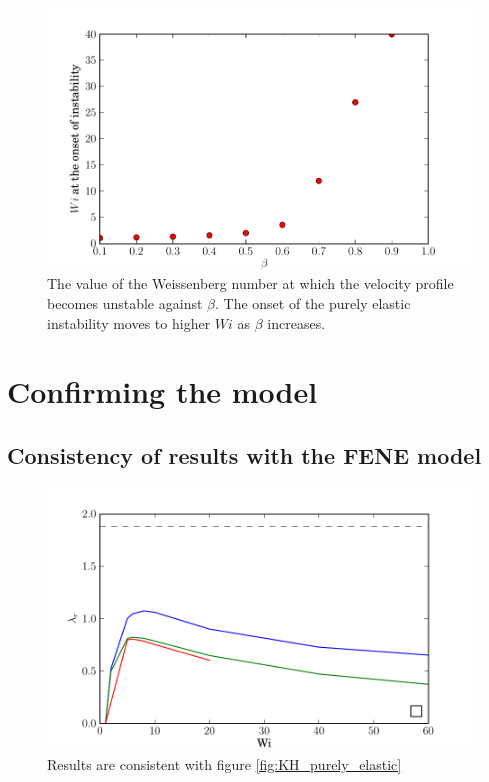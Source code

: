 \documentclass{jfm}
\begin{document}
\begin{figure}
    \includegraphics[width=\textwidth]{KH_onset_beta_Wi}
    \caption{The value of the Weissenberg number at which the velocity profile becomes unstable against $\beta$. The onset of the purely elastic instability moves to higher $Wi$ as $\beta$ increases.}
    \label{fig:KH_elastic_onset}
\end{figure}

\section{Confirming the model}

\subsection{Consistency of results with the FENE model}
\begin{figure}
    \includegraphics[width=\textwidth]{FENE_low_Re_vary_Wi}
    \caption{Results are consistent with figure \ref{fig:KH_purely_elastic}}
    \label{fig:FENE_low_Re}
\end{figure}
\end{document}
